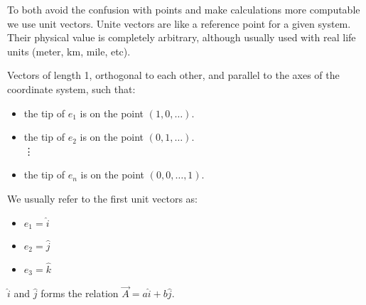 To both avoid the confusion with points and make calculations more computable we use unit vectors. Unite vectors are like a reference point for a given system. Their physical value is completely arbitrary, although usually used with real life units (meter, km, mile, etc).

\begin{definition}
    Vectors of length 1, orthogonal to each other, and parallel to the axes of the coordinate system, such that:
    \begin{itemize}
        \item the tip of $e_1$ is on the point $(1,0,\ldots)$.
        \item the tip of $e_2$ is on the point $(0,1,\ldots)$.
            \\ \vdots
        \item the tip of $e_n$ is on the point $(0,0,\ldots,1)$.
    \end{itemize}
\end{definition}

We usually refer to the first unit vectors as:
\begin{itemize}
    \item $e_1 = \hat{i}$
    \item $e_2 = \hat{j}$
    \item $e_3 = \hat{k}$
\end{itemize}

$\hat{i}$ and $\hat{j}$ forms the relation $\vec{A}=a\hat{i}+b\hat{j}$.


